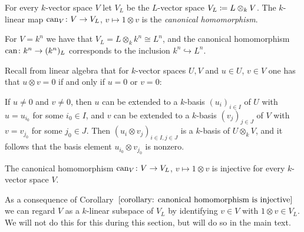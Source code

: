 \begin{definition}
  For every $k$-vector space $V$ let $V_L$ be the $L$-vector space $V_L \coloneqq L \otimes_k V$.
  The $k$-linear map $\operatorname{can}_V \colon V \to V_L$, $v \mapsto 1 \otimes v$ is the \emph{canonical homomorphism}.
\end{definition}


\begin{example}
  \label{example: extension of scalars for kn}
  For $V = k^n$ we have that $V_L = L \otimes_k k^n \cong L^n$, and the canonical homomorphism $\operatorname{can} \colon k^n \to (k^n)_L$ corresponds to the inclusion $k^n \hookrightarrow L^n$.
\end{example}


\begin{recall}
  Recall from linear algebra that for $k$-vector spaces $U, V$ and $u \in U$, $v \in V$ one has that $u \otimes v = 0$ if and only if $u = 0$ or $v = 0$:
  
  If $u \neq 0$ and $v \neq 0$, then $u$ can be extended to a $k$-basis $(u_i)_{i \in I}$ of $U$ with $u = u_{i_0}$ for some $i_0 \in I$, and $v$ can be extended to a $k$-basis $(v_j)_{j \in J}$ of $V$ with $v = v_{j_0}$ for some $j_0 \in J$.
  Then $(u_i \otimes v_j)_{i \in I, j \in J}$ is a $k$-basis of $U \otimes_k V$, and it follows that the basis element $u_{i_0} \otimes v_{j_0}$ is nonzero.
\end{recall}


\begin{corollary}
  \label{corollary: canonical homomorphism is injective}
  The canonical homomorphism $\operatorname{can}_V \colon V \to V_L$, $v \mapsto 1 \otimes v$ is injective for every $k$-vector space $V$.
\end{corollary}


\begin{fluff}
  As a consequence of Corollary~$\ref{corollary: canonical homomorphism is injective}$ we can regard $V$ as a $k$-linear subspace of $V_L$ by identifying $v \in V$ with $1 \otimes v \in V_L$.
  We will not do this for this during this section, but will do so in the main text.
\end{fluff}


